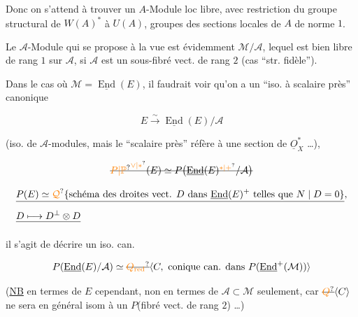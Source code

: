 Donc on s'attend à trouver un $A$-Module loc libre, avec restriction du groupe structural de $W(A)^*$ à $U(A)$,  groupes des sections locales de $A$ de norme $1$.

Le $\mathcal A$-Module qui se propose à la vue est évidemment $\mathcal M/\mathcal A$, lequel est bien libre de rang $1$ sur $\mathcal A$, si $\mathcal A$ est un sous-fibré vect. de rang $2$  (cas ``str. fidèle''). 

Dans le cas où $\mathcal M=\underline{\operatorname{End}}(E)$, il faudrait voir qu'on a un ``iso. à scalaire près'' canonique

\[
E\xrightarrow{\sim}\underline{\operatorname{End}}(E)/\mathcal A
\]

(iso. de $\mathcal A$-modules, mais le ``scalaire près'' réfère à une section de $\underline O_X^*$ \ldots), 

\[
\deleted{{\unsure{P|\mathbb P}}^{\unsure{\vee|*}}(E)\simeq P\bigl(\underline{\operatorname{End}}(E)^{\unsure{*|+}}/\mathcal A\bigr)}
\]

\margin{$\begin{gathered}|\\|\\|\\\unsure{!|\vert}\\)\end{gathered}$}



\[
\begin{aligned}
&\deleted{P(E)\simeq\unsure{\mathcal Q}\{\text{schéma des droites vect. }D\text{ dans }\underline{\operatorname{End}}(E)^+\text{ telles que }N\mid D=0\}},\\
&\deleted{D\longmapsto D^{\perp}\otimes D}
\end{aligned}
\]

il s'agit de décrire un iso. can.

\[
P(\underline{\operatorname{End}}(E)/\mathcal A)\simeq\deleted{\unsure{Q_{\mathrm{red}}}}\inserted{C,\ \text{conique can. dans }P(\underline{\operatorname{End}}^+(\mathcal M))}
\]

(\uline{NB} en termes de $E$ cependant, non en termes de $\mathcal A\subset\mathcal M$ seulement, car $\deleted{\unsure{Q}}\inserted{C}$ ne sera en général  isom à un $P$(fibré vect. de rang $2$) \ldots)

